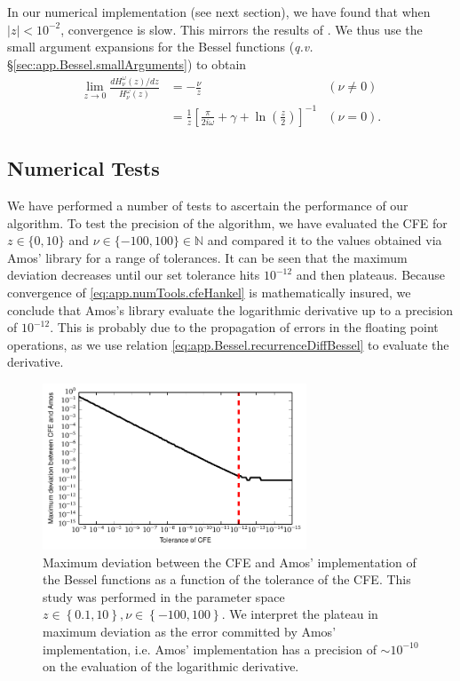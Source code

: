 In our numerical implementation (see next section), we have found that when $|z|<10^{-2}$, convergence is slow. This mirrors the results of \cite{THO1986}.
We thus use the small argument expansions for the Bessel functions (\textit{q.v.} \S \ref{sec:app.Bessel.smallArguments}) to obtain
  \begin{subequations}
  \begin{align}
   \lim_{z\rightarrow0}\frac{dH^\omega_\nu(z)/dz}{H^\omega_\nu(z)}	&= -\frac{\nu}{z}	& (\nu\neq0)	\\
									&= \frac{1}{z}\left[\frac{\pi}{2i\omega}+\gamma+\ln\left(\frac{z}{2}\right)\right]^{-1} & (\nu=0).
  \end{align}
  \end{subequations}


\subsection{Numerical Tests}
We have performed a number of tests to ascertain the performance of our algorithm. 
To test the precision of the algorithm, we have evaluated the CFE for $z\in\{0,10\}$
and $\nu\in\{-100,100\}\in\mathbb{N}$ and compared it to the values obtained via
Amos' library for a range of tolerances. It can be seen that the maximum deviation 
decreases until our set tolerance hits $10^{-12}$ and then plateaus. Because 
convergence of \ref{eq:app.numTools.cfeHankel} is mathematically insured, we 
conclude that Amos's library evaluate the logarithmic derivative up to 
a precision of $10^{-12}$. This is probably due to the propagation 
of errors in the floating point operations, as we use relation
\eqref{eq:app.Bessel.recurrenceDiffBessel}
to evaluate the derivative. 

\begin{figure}
 \centering
 \includegraphics[width=0.7\textwidth]{figs/app-numTools/maxDiff.pdf}
 \caption[Maximum deviation between the CFE and Amos' implementation as a function
	  of the CFE tolerance]%
	 {Maximum deviation between the CFE and Amos' implementation of the Bessel functions
	 as a function of the tolerance of the CFE. This study was performed in the parameter
	 space $z\in\left\{0.1,10\right\}, \nu\in\left\{-100,100\right\}$. We interpret 
	 the plateau in maximum deviation as the error committed by Amos' implementation, i.e.
	 Amos' implementation has a precision of $\sim10^{-10}$ on the evaluation of the logarithmic derivative.}
\end{figure}


